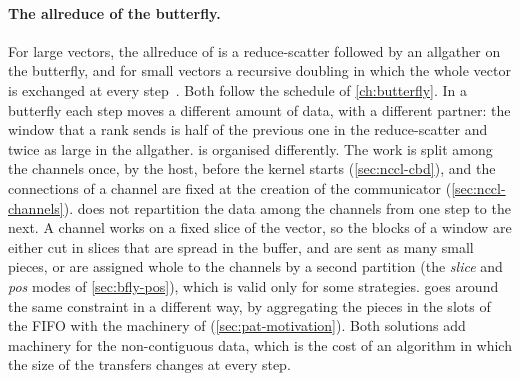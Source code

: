 \paragraph{The allreduce of the butterfly.}
For large vectors, the allreduce of \bine{} is a reduce-scatter followed by an allgather on the \bine{} butterfly, and for small vectors a recursive doubling in which the whole vector is exchanged at every step~\cite{desensi2025bine}.
Both follow the schedule of \cref{ch:butterfly}.
In a butterfly each step moves a different amount of data, with a different partner: the window that a rank sends is half of the previous one in the reduce-scatter and twice as large in the allgather.
\nccl{} is organised differently.
The work is split among the channels once, by the host, before the kernel starts (\cref{sec:nccl-cbd}), and the connections of a channel are fixed at the creation of the communicator (\cref{sec:nccl-channels}). \nccl{} does not repartition the data among the channels from one step to the next.
A channel works on a fixed slice of the vector, so the blocks of a window are either cut in slices that are spread in the buffer, and are sent as many small pieces, or are assigned whole to the channels by a second partition (the \emph{slice} and \emph{pos} modes of \cref{sec:bfly-pos}), which is valid only for some strategies.
 goes around the same constraint in a different way, by aggregating the pieces in the slots of the FIFO with the machinery of \pat{} (\cref{sec:pat-motivation}).
Both solutions add machinery for the non-contiguous data, which is the cost of an algorithm in which the size of the transfers changes at every step.

